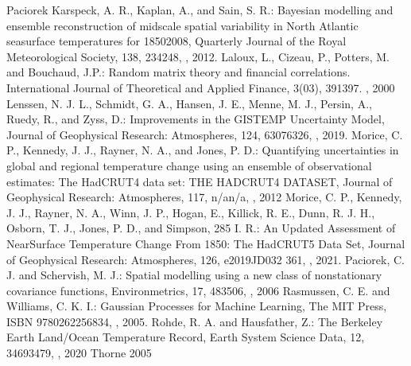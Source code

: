\documentclass[letterpaper,10pt,english]{sphinxmanual}
\begin{document}
\begin{sphinxthebibliography}{Paciorek}
\sphinxAtStartPar
Karspeck, A. R., Kaplan, A., and Sain, S. R.: Bayesian modelling and ensemble reconstruction of mid\sphinxhyphen{}scale spatial variability in North Atlantic sea\sphinxhyphen{}surface temperatures for 1850\sphinxhyphen{}2008, Quarterly Journal of the Royal Meteorological Society, 138, 234\textendash{}248, , 2012.
\sphinxAtStartPar
Laloux, L., Cizeau, P., Potters, M. and Bouchaud, J.P.: Random matrix theory and financial correlations. International Journal of Theoretical and Applied Finance, 3(03), 391\sphinxhyphen{}397. , 2000
\sphinxAtStartPar
Lenssen, N. J. L., Schmidt, G. A., Hansen, J. E., Menne, M. J., Persin, A., Ruedy, R., and Zyss, D.: Improvements in the GISTEMP Uncertainty Model, Journal of Geophysical Research: Atmospheres, 124, 6307\textendash{}6326, , 2019.
\sphinxAtStartPar
Morice, C. P., Kennedy, J. J., Rayner, N. A., and Jones, P. D.: Quantifying uncertainties in global and regional temperature change using an ensemble of observational estimates: The HadCRUT4 data set: THE HADCRUT4 DATASET, Journal of Geophysical Research: Atmospheres, 117, n/a\textendash{}n/a, , 2012
\sphinxAtStartPar
Morice, C. P., Kennedy, J. J., Rayner, N. A., Winn, J. P., Hogan, E., Killick, R. E., Dunn, R. J. H., Osborn, T. J., Jones, P. D., and Simpson, 285 I. R.: An Updated Assessment of Near\sphinxhyphen{}Surface Temperature Change From 1850: The HadCRUT5 Data Set, Journal of Geophysical Research: Atmospheres, 126, e2019JD032 361, , 2021.
\sphinxAtStartPar
Paciorek, C. J. and Schervish, M. J.: Spatial modelling using a new class of nonstationary covariance functions, Environmetrics, 17, 483\textendash{}506, , 2006
\sphinxAtStartPar
Rasmussen, C. E. and Williams, C. K. I.: Gaussian Processes for Machine Learning, The MIT Press, ISBN 978\sphinxhyphen{}0\sphinxhyphen{}262\sphinxhyphen{}25683\sphinxhyphen{}4, , 2005.
\sphinxAtStartPar
Rohde, R. A. and Hausfather, Z.: The Berkeley Earth Land/Ocean Temperature Record, Earth System Science Data, 12, 3469\textendash{}3479, , 2020
\sphinxAtStartPar
Thorne 2005
\end{sphinxthebibliography}
\end{document}
